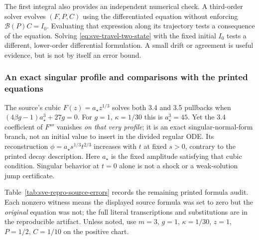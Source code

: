 The first integral also provides an independent numerical check.
A third-order solver evolves $(F,P,C)$ using the differentiated equation
without enforcing $\mathcal B(P)C=I_0$. Evaluating that expression along its
trajectory tests a consequence of the equation. Solving
\eqref{eq:sve-travel-two-state} with the fixed initial $I_0$ tests a
different, lower-order differential formulation. A small drift or
agreement is useful evidence, but is not by itself an error bound.

\subsubsection{An exact singular profile and comparisons with the printed equations}

The source's cubic $F(z)=a_\star z^{1/3}$ solves both 3.4 and 3.5 pullbacks when
$(4\beta g-1)a_\star^3+27g=0$. For $g=1$, $\kappa=1/30$ this is $a_\star^3=45$.
Yet the 3.4 coefficient of $F'''$ vanishes \emph{on that very profile}; it
is an exact singular-normal-form branch, not an initial value to insert in
the divided regular ODE. Its reconstruction
$\phi=a_\star s^{1/3}t^{2/3}$ increases with $t$ at fixed $s>0$, contrary
to the printed decay description. Here $a_\star$ is the fixed amplitude satisfying that cubic condition. Singular behavior at $t=0$ alone is not
a shock or a weak-solution jump certificate.

Table~\ref{tab:sve-repro-source-errors} records the remaining printed
formula audit. Each nonzero witness means the displayed source formula was
set to zero but the \emph{original} equation was not; the full literal
transcriptions and substitutions are in the reproducible artifact. Unless
noted, use $m=3$, $g=1$, $\kappa=1/30$, $z=1$, $P=1/2$, $C=1/10$ on the
positive chart.

